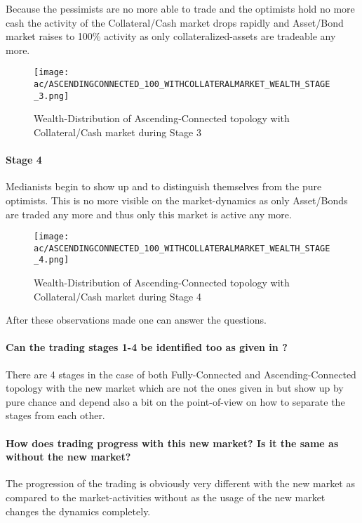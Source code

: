 \documentclass[Bachelorarbeit.tex]{subfiles}
\begin{document}
Because the pessimists are no more able to trade and the optimists hold no more cash the activity of the Collateral/Cash market drops rapidly and Asset/Bond market raises to 100\% activity as only collateralized-assets are tradeable any more.

\begin{figure}[H]
	\centering
  \texttt{[image: ac/ASCENDINGCONNECTED\_100\_WITHCOLLATERALMARKET\_WEALTH\_STAGE\_3.png]}
  	\caption{Wealth-Distribution of Ascending-Connected topology with Collateral/Cash market during Stage 3}
	\label{fig:wealth_ASCENDINGCONNECTED_100_WITHCOLLATERALMARKET_WEALTH_STAGE_3}
\end{figure}

\paragraph{Stage 4}
Medianists begin to show up and to distinguish themselves from the pure optimists. This is no more visible on the market-dynamics as only Asset/Bonds are traded any more and thus only this market is active any more.

\begin{figure}[H]
	\centering
  \texttt{[image: ac/ASCENDINGCONNECTED\_100\_WITHCOLLATERALMARKET\_WEALTH\_STAGE\_4.png]}
  	\caption{Wealth-Distribution of Ascending-Connected topology with Collateral/Cash market during Stage 4}
	\label{fig:wealth_ASCENDINGCONNECTED_100_WITHCOLLATERALMARKET_WEALTH_STAGE_4}
\end{figure}

After these observations made one can answer the questions.

\paragraph{Can the trading stages 1-4 be identified too as given in \cite{Breuer2015}?}
There are 4 stages in the case of both Fully-Connected and Ascending-Connected topology with the new market which are not the ones given in \cite{Breuer2015} but show up by pure chance and depend also a bit on the point-of-view on how to separate the stages from each other. 

\paragraph{How does trading progress with this new market? Is it the same as without the new market?}
The progression of the trading is obviously very different with the new market as compared to the market-activities without as the usage of the new market changes the dynamics completely.
\end{document}
